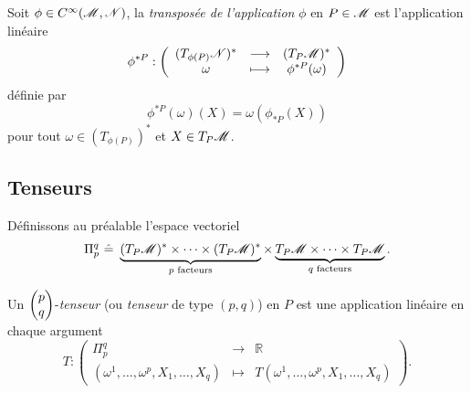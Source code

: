 \documentclass[a4paper,11pt]{report}
\begin{document}
                \begin{definition}
                    Soit $\phi\in C^\infty(\mathscr{M},\mathscr{N})$, la \textit{transposée de l'application} $\phi$ en $P\in\mathscr{M}$ est l'application linéaire
                    \begin{equation}
                        \phi^{*P}:\left(
                    \begin{array}{ccc}
                        (T_{\phi(P)}\mathscr{N})^* & \longrightarrow & (T_P\mathscr{M})^* \\
                        \omega & \longmapsto & \phi^{*P}(\omega)
                    \end{array}
                    \right)
                    \end{equation}
                    définie par
                    \begin{equation}
                        \phi^{*P}(\omega)(X) = \omega(\phi_{*P}(X))
                    \end{equation}
                    pour tout $\omega\in (T_{\phi(P)})^*$ et $X\in T_P\mathscr{M}$.
                \end{definition}
            
            \subsection{Tenseurs}
                
                Définissons au préalable l'espace vectoriel
                \begin{equation}
                    \Pi^q_p ~\hat{=}~ \underbrace{(T_P\mathscr{M})^*\times\dots\times (T_P\mathscr{M})^*}_{\text{$p$ facteurs}}\times\underbrace{T_P\mathscr{M}\times\dots\times T_P\mathscr{M}}_{\text{$q$ facteurs}}.
                \end{equation}
                
                \begin{definition}
                    Un $\begin{pmatrix}p\\q\end{pmatrix}$-\textit{tenseur} (ou \textit{tenseur} de type $(p,q)$) en $P$ est une application linéaire en chaque argument
                    \begin{equation}
                        T:\left(
                    \begin{array}{ccc}
                        \Pi^q_p & \longrightarrow & \mathbb{R} \\
                        (\omega^1,\dots,\omega^p,X_1,\dots,X_q) & \longmapsto & T(\omega^1,\dots,\omega^p,X_1,\dots,X_q)
                    \end{array}
                    \right).
                    \end{equation}
                \end{definition}
                
\end{document}
